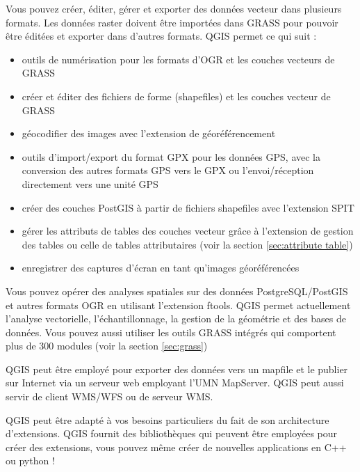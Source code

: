 
Vous pouvez créer, éditer, gérer et exporter des données vecteur dans plusieurs formats. Les données raster doivent être importées dans GRASS pour pouvoir être éditées et exporter dans d'autres formats. QGIS permet ce qui suit :  

\begin{itemize}
\item outils de numérisation pour les formats d'OGR et les couches vecteurs de GRASS
\item créer et éditer des fichiers de forme (shapefiles) et les couches vecteur de GRASS
\item géocodifier des images avec l'extension de géoréférencement
\item outils d'import/export du format GPX pour les données GPS, avec la conversion des autres formats GPS vers le GPX ou l'envoi/réception directement vers une unité GPS
\item créer des couches PostGIS à partir de fichiers shapefiles avec l'extension SPIT
\item gérer les attributs de tables des couches vecteur grâce à l'extension de gestion des tables ou celle de tables attributaires (voir la section \ref{sec:attribute table})
\item enregistrer des captures d'écran en tant qu'images géoréférencées
\end{itemize}


Vous pouvez opérer des analyses spatiales sur des données PostgreSQL/PostGIS et autres formats OGR en utilisant l'extension ftools. QGIS permet actuellement l'analyse vectorielle, l'échantillonnage, la gestion de la géométrie et des bases de données. Vous pouvez aussi utiliser les outils GRASS intégrés qui comportent plus de 300 modules (voir la section \ref{sec:grass})


QGIS peut être employé pour exporter des données vers un mapfile et le publier sur Internet via un serveur web employant l'UMN MapServer. QGIS peut aussi servir de client WMS/WFS ou de serveur WMS.


QGIS peut être adapté à vos besoins particuliers du fait de son architecture d'extensions. QGIS fournit des bibliothèques qui peuvent être employées pour créer des extensions, vous pouvez même créer de nouvelles applications en C++ ou python !

